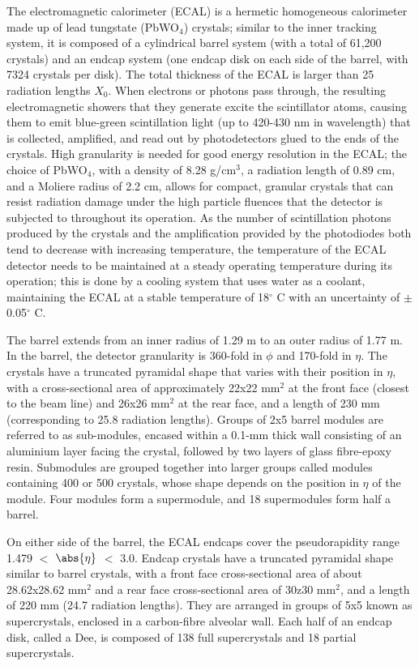 The electromagnetic calorimeter (ECAL) is a hermetic homogeneous calorimeter made up of lead tungstate (PbWO$_4$) crystals; similar to the inner tracking system, it is composed of a cylindrical barrel system (with a total of 61,200 crystals) and an endcap system (one endcap disk on each side of the barrel, with 7324 crystals per disk). The total thickness of the ECAL is larger than 25 radiation lengths $X_0$. When electrons or photons pass through, the resulting electromagnetic showers that they generate excite the scintillator atoms, causing them to emit blue-green scintillation light (up to 420-430 nm in wavelength) that is collected, amplified, and read out by photodetectors glued to the ends of the crystals. High granularity is needed for good energy resolution in the ECAL; the choice of PbWO$_4$, with a density of 8.28 g/cm$^3$, a radiation length of 0.89 cm, and a Moliere radius of 2.2 cm, allows for compact, granular crystals that can resist radiation damage under the high particle fluences that the detector is subjected to throughout its operation. As the number of scintillation photons produced by the crystals and the amplification provided by the photodiodes both tend to decrease with increasing temperature, the temperature of the ECAL detector needs to be maintained at a steady operating temperature during its operation; this is done by a cooling system that uses water as a coolant, maintaining the ECAL at a stable temperature of 18$^{\circ}$ C with an uncertainty of $\pm$0.05$^{\circ}$ C.

The barrel extends from an inner radius of 1.29 m to an outer radius of 1.77 m. In the barrel, the detector granularity is 360-fold in $\phi$ and 170-fold in $\eta$. The crystals have a truncated pyramidal shape that varies with their position in $\eta$, with a cross-sectional area of approximately 22x22 mm$^2$ at the front face (closest to the beam line) and 26x26 mm$^2$ at the rear face, and a length of 230 mm (corresponding to 25.8 radiation lengths). Groups of 2x5 barrel modules are referred to as sub-modules, encased within a 0.1-mm thick wall consisting of an aluminium layer facing the crystal, followed by two layers of glass fibre-epoxy resin. Submodules are grouped together into larger groups called modules containing 400 or 500 crystals, whose shape depends on the position in $\eta$ of the module. Four modules form a supermodule, and 18 supermodules form half a barrel.

On either side of the barrel, the ECAL endcaps cover the pseudorapidity range 1.479 $<$ $\abs{\eta}$ $<$ 3.0. Endcap crystals have a truncated pyramidal shape similar to barrel crystals, with a front face cross-sectional area of about 28.62x28.62 mm$^2$ and a rear face cross-sectional area of 30z30 mm$^2$, and a length of 220 mm (24.7 radiation lengths). They are arranged in groups of 5x5 known as supercrystals, enclosed in a carbon-fibre alveolar wall. Each half of an endcap disk, called a Dee, is composed of 138 full supercrystals and 18 partial supercrystals.

